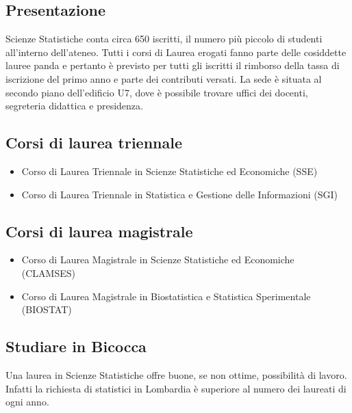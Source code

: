 
\subsection{Presentazione}
Scienze Statistiche conta circa 650 iscritti, il numero più piccolo di studenti all'interno dell'ateneo. Tutti i corsi di Laurea erogati fanno parte delle cosiddette lauree panda e pertanto è previsto per tutti gli iscritti il rimborso della tassa di iscrizione del primo anno e parte dei contributi versati. 
La sede è situata al secondo piano dell'edificio U7, dove è possibile trovare uffici dei docenti, segreteria didattica e presidenza. 

\subsection{Corsi di laurea triennale} 

\begin{itemize}
\item Corso di Laurea Triennale in Scienze Statistiche ed Economiche (SSE) 
\item Corso di Laurea Triennale in Statistica e Gestione delle Informazioni (SGI) 
\end{itemize}

\subsection{Corsi di laurea magistrale}
\begin{itemize}
\item Corso di Laurea Magistrale in Scienze Statistiche ed Economiche (CLAMSES) 
\item Corso di Laurea Magistrale in Biostatistica e Statistica Sperimentale (BIOSTAT) 
\end{itemize}

\subsection{Studiare in Bicocca}
Una laurea in Scienze Statistiche offre buone, se non ottime, possibilità di lavoro. Infatti la richiesta di statistici in Lombardia è superiore al numero dei laureati di ogni anno. 

